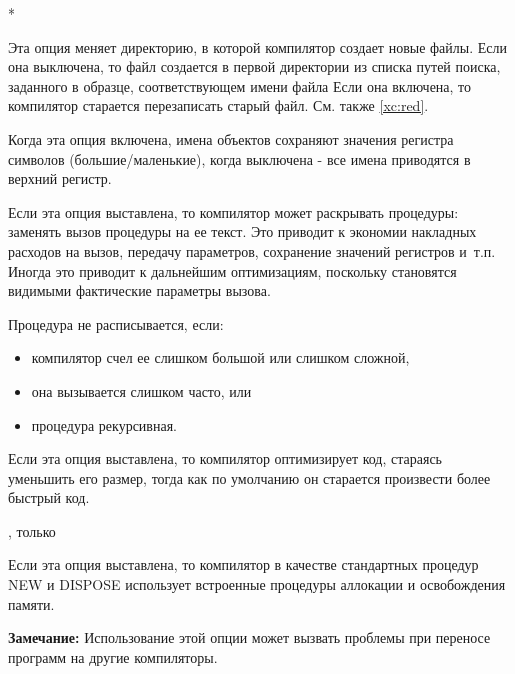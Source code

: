 \begin{description}
        \MLBegin{}*\MLEnd{}

Эта опция меняет директорию, в которой компилятор создает новые
файлы. Если она выключена, то файл создается в первой директории
из списка путей поиска, заданного в образце, соответствующем имени файла
Если она включена, то компилятор старается перезаписать старый файл.
См. также \ref{xc:red}.

\ifgenvax
{}
        \MLBegin{}\ModeC{}\MLEnd{}

Когда эта опция включена, имена объектов сохраняют значения регистра символов
(большие/маленькие),
когда выключена - все имена приводятся в верхний регистр.
\fi

        \MLBegin{}\ModeC{}\MLEnd{}

Если эта опция выставлена, то компилятор может раскрывать
процедуры: заменять вызов процедуры на ее текст. Это 
приводит к экономии накладных расходов на вызов, передачу
параметров, сохранение значений регистров и~т.п. Иногда это 
приводит к дальнейшим оптимизациям, поскольку становятся 
видимыми фактические параметры вызова.

Процедура не расписывается, если:
        \begin{itemize}
        \item компилятор счел ее слишком большой или слишком сложной,
        \item она вызывается слишком часто, или
        \item процедура рекурсивная.
        \end{itemize}

\ifgencode
{}
        \MLBegin{}\ModeC{}\MLEnd{}

Если эта опция выставлена, то компилятор оптимизирует код, стараясь
уменьшить его размер, тогда как по умолчанию он старается
произвести более быстрый код.
\fi

        \MLBegin{}\ModeC{}, только \mt{}\MLEnd{} \header

Если эта опция выставлена, то компилятор в качестве стандартных
процедур NEW и DISPOSE использует встроенные процедуры аллокации
и освобождения памяти.

{\bf Замечание:} Использование этой опции может вызвать 
проблемы при переносе программ на другие компиляторы.


\end{description}
